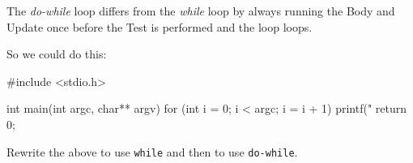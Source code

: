 The \emph{do-while} loop differs from the \emph{while} loop by always running the Body and Update once before the Test is performed and the loop loops.

So we could do this:
\begin{codeblock}
#include <stdio.h>

int main(int argc, char** argv) {
    for (int i = 0; i < argc; i = i + 1) {
        printf("%
    }
    return 0;
}
\end{codeblock}

\begin{exercise}
Rewrite the above to use \texttt{while} and then to use \texttt{do-while}. 
\end{exercise}

